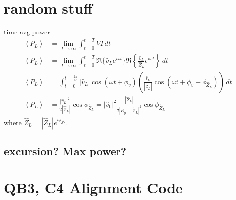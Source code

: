 \documentclass[10pt]{book}
\begin{document}
\chapter{random stuff}
time avg power
\begin{align}
\left\langle P_L \right\rangle&=\lim_{T\rightarrow \infty} \int_{t=0}^{t=T} VI\, dt\\
\left\langle P_L \right\rangle &=\lim_{T\rightarrow \infty} \int_{t=0}^{t=T} \Re\{\hat{v}_L e^{i\omega t}\}\Re \left\{ \frac{\hat{v}_L }{\hat{Z}_L}e^{i \omega t} \right\} \, dt\\
\left\langle P_L \right\rangle &=\int_{t=0}^{t=\frac{2\pi}{\omega}} \left| \hat{v}_L \right|
                                 \cos (\omega t+\phi_v)
                                \left(
                                  \frac{ \left| \hat{v}_L \right|}
                                    {\left| \hat{Z}_L \right| }
                                  \cos(\omega t +\phi_v - \phi_{\hat{Z}_L})
                                \right) \, dt\\
\left\langle P_L \right\rangle &= \frac{\left| \hat{v}_L \right|^2}{2\left| \hat{Z}_L\right|}\cos\phi_{\hat{Z}_L}=\left| \hat{v}_0 \right|^2\frac{\left| \hat{Z}_L\right|}{2\left| R_g+\hat{Z}_L\right|^2}\cos\phi_{\hat{Z}_L}\label{eq:time-avg-pwr-load}
\end{align}
where $\hat{Z}_L=\left| \hat{Z}_L \right| e^{i\phi_{\hat{Z}_L}}$.

\section{excursion? Max power?}

\chapter{QB3, C4 Alignment Code}\label{appendix:qt-matlab}
%
 
\end{document}
